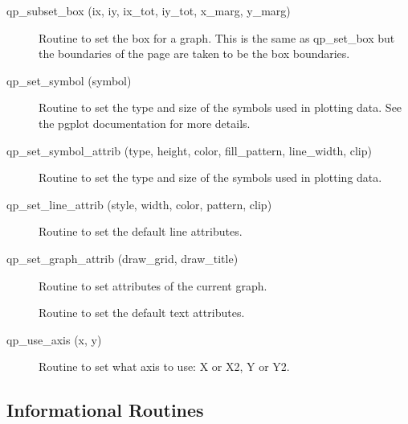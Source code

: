 \begin{description}
\label{r:qp.subset.box}
\item[qp_subset_box (ix, iy, ix_tot, iy_tot, x_marg, y_marg)] \Newline 
     Routine to set the box for a graph. This is the same as
     qp_set_box but the boundaries of the page are taken to be the box boundaries.

\label{r:qp.set.symbol}
\item[qp_set_symbol (symbol)] \Newline 
     Routine to set the type and size of the symbols used in plotting data.
     See the pgplot documentation for more details.

\label{r:qp.set.symbol.attrib}
\item[qp_set_symbol_attrib (type, height, color, fill_pattern, line_width, clip)] \Newline 
     Routine to set the type and size of the symbols used in plotting data.

\label{r:qp.set.line.attrib}
\item[qp_set_line_attrib (style, width, color, pattern, clip)] \Newline 
     Routine to set the default line attributes.

\label{r:qp.set.graph.attrib}
\item[qp_set_graph_attrib (draw_grid, draw_title)] \Newline 
     Routine to set attributes of the current graph.

\label{r:qp.set.text.attrib}
\item[\protect\parbox{6in}{qp_set_text_attrib (who, height, color, \\
  \hspace*{1in} background, uniform_spacing, spacing_factor) }] \Newline 
     Routine to set the default text attributes.

\label{r:qp.use.axis}
\item[qp_use_axis (x, y)] \Newline 
Routine to set what axis to use: X or X2, Y or Y2.

\end{description}

\subsection{Informational Routines}

